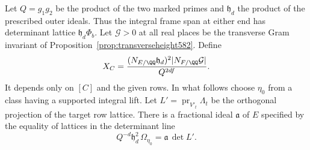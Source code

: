 \documentclass[a4paper,11pt]{article}
\theoremstyle{definition}
\theoremstyle{remark}
\numberwithin{equation}{section}
\begin{document}
Let \(Q=g_1g_2\) be the product of the two marked primes and
\(\mathfrak h_d\) the product of the prescribed outer ideals.
Thus the integral frame span at either end has determinant lattice
\(\mathfrak h_d\Phi_b\). Let \(\mathcal G>0\) at all real places
be the transverse Gram invariant of
Proposition~\ref{prop:transverseheight582}. Define
\[
       X_C=\frac{(N_{E/\QQ}\mathfrak h_d)^2
                    |N_{F/\QQ}\mathcal G|}{Q^{2df}} .
\]
It depends only on \([C]\) and the given rows. In what follows
choose \(\eta_0\) from a class having a supported integral lift.
Let \(L'=\operatorname{pr}_{V'_t}\Lambda_t\) be the orthogonal
projection of the target row lattice. There is a fractional ideal
\(\mathfrak a\) of \(E\) specified by the equality of lattices
in the determinant line
\[
   Q^{-d}\mathfrak h_d^2\,\Omega_{\eta_0}
                            =\mathfrak a\,\det L'.
\]
\end{document}
